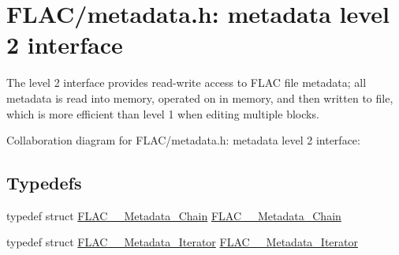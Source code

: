 \hypertarget{group__flac__metadata__level2}{}\section{F\+L\+A\+C/metadata.h\+: metadata level 2 interface}
\label{group__flac__metadata__level2}


The level 2 interface provides read-\/write access to F\+L\+AC file metadata; all metadata is read into memory, operated on in memory, and then written to file, which is more efficient than level 1 when editing multiple blocks.  


Collaboration diagram for F\+L\+A\+C/metadata.h\+: metadata level 2 interface\+:
\subsection*{Typedefs}
\begin{DoxyCompactItemize}
\item 
typedef struct \hyperlink{group__flac__metadata__level2_gaec6993c60b88f222a52af86f8f47bfdf}{F\+L\+A\+C\+\_\+\+\_\+\+Metadata\+\_\+\+Chain} \hyperlink{group__flac__metadata__level2_gaec6993c60b88f222a52af86f8f47bfdf}{F\+L\+A\+C\+\_\+\+\_\+\+Metadata\+\_\+\+Chain}
\item 
typedef struct \hyperlink{group__flac__metadata__level2_ga9f3e135a07cdef7e51597646aa7b89b2}{F\+L\+A\+C\+\_\+\+\_\+\+Metadata\+\_\+\+Iterator} \hyperlink{group__flac__metadata__level2_ga9f3e135a07cdef7e51597646aa7b89b2}{F\+L\+A\+C\+\_\+\+\_\+\+Metadata\+\_\+\+Iterator}
\end{DoxyCompactItemize}

